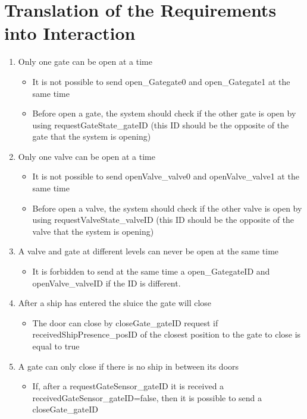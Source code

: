 \section{Translation of the Requirements into Interaction}
\begin{enumerate}
	\item Only one gate can be open at a time
	
		\begin{itemize}
			\item It is not possible to send open\_Gategate0 and open\_Gategate1 at the same time
			\item Before open a gate, the system should check if the other gate is open by using requestGateState\_gateID (this ID should be the opposite of the gate that the system is opening)
		\end{itemize}
	
	\item Only one valve can be open at a time
	
		\begin{itemize}
			\item It is not possible to send openValve\_valve0 and openValve\_valve1 at the same time
			\item Before open a valve, the system should check if the other valve is open by using requestValveState\_valveID (this ID should be the opposite of the valve that the system is opening)
		\end{itemize}
	
	\item A valve and gate at different levels can never be open at the same time
		\begin{itemize}
			\item It is forbidden to send at the same time a open\_GategateID and openValve\_valveID if the ID is different.
		\end{itemize}
	
	\item After a ship has entered the sluice the gate will close
	\begin{itemize}
		\item The door can close by closeGate\_gateID request if receivedShipPresence\_posID of the closest position to the gate to close is equal to true
		
	\end{itemize}
	\item A gate can only close if there is no ship in between its doors
	\begin{itemize}
		\item If, after a requestGateSensor\_gateID it is received a receivedGateSensor\_gateID=false, then it is possible to send a closeGate\_gateID
		

\end{itemize}
\end{enumerate}

